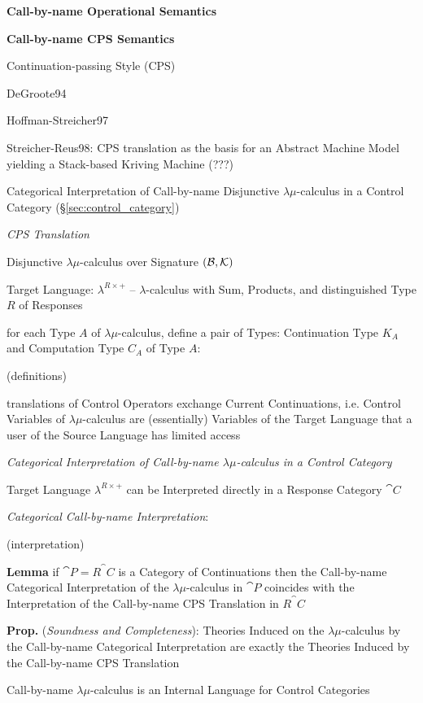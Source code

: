 \textbf{Call-by-name Operational Semantics}

\textbf{Call-by-name CPS Semantics}

Continuation-passing Style (CPS)

DeGroote94

Hoffman-Streicher97

Streicher-Reus98: CPS translation as the basis for an Abstract Machine
Model yielding a Stack-based Kriving Machine (???) %

Categorical Interpretation of Call-by-name Disjunctive
$\lambda\mu$-calculus in a Control Category
(\S\ref{sec:control_category})

\emph{CPS Translation}

Disjunctive $\lambda\mu$-calculus over Signature
$(\mathcal{B},\mathcal{K})$

Target Language: $\lambda^{R\times+}$ -- $\lambda$-calculus with Sum,
Products, and distinguished Type $R$ of Responses %

for each Type $A$ of $\lambda\mu$-calculus, define a pair of Types:
Continuation Type $K_A$ and Computation Type $C_A$ of Type $A$:

(definitions) %

translations of Control Operators exchange Current Continuations, i.e.
Control Variables of $\lambda\mu$-calculus are (essentially) Variables
of the Target Language that a user of the Source Language has limited
access %

\emph{Categorical Interpretation of Call-by-name $\lambda\mu$-calculus
  in a Control Category}

Target Language $\lambda^{R\times+}$ can be Interpreted directly in a
Response Category $\cat{C}$

\emph{Categorical Call-by-name Interpretation}:

(interpretation) %

\textbf{Lemma} if $\cat{P} = R^\cat{C}$ is a Category of Continuations
then the Call-by-name Categorical Interpretation of the
$\lambda\mu$-calculus in $\cat{P}$ coincides with the Interpretation
of the Call-by-name CPS Translation in $R^\cat{C}$

\textbf{Prop.} (\emph{Soundness and Completeness}): Theories Induced
on the $\lambda\mu$-calculus by the Call-by-name Categorical
Interpretation are exactly the Theories Induced by the Call-by-name
CPS Translation

Call-by-name $\lambda\mu$-calculus is an Internal Language for Control
Categories



